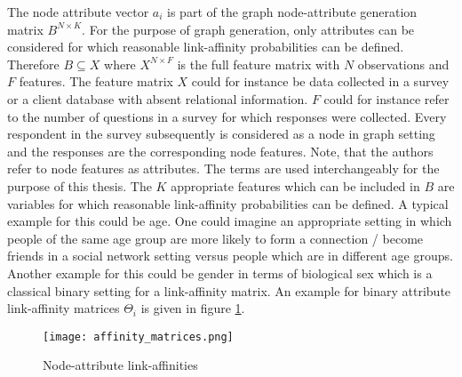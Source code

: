 	\noindent The node attribute vector $a_i$ is part of the graph node-attribute
	generation matrix $B^{N \times K}$. For the purpose of graph generation, 
	only attributes can be considered for which reasonable link-affinity 
	probabilities can be defined. Therefore $B \subseteq X$ where $X^{N \times F}$ 
	is the full feature matrix with $N$ observations and $F$ features. The 
	feature matrix $X$ could for instance be data collected in a survey or a 
	client database with absent relational information. $F$ could for instance 
	refer to the number of questions in a survey for which responses were 
	collected. Every respondent in the survey subsequently is considered as a 
	node in graph setting and the responses are the corresponding node features. 
	Note, that the authors refer to node features as attributes. The terms are 
	used interchangeably for the purpose of this thesis. The $K$ appropriate 
	features which can be included in $B$ are variables for which reasonable
	link-affinity probabilities can be defined. A typical example for this 
	could be age. One could imagine an appropriate setting in which people of 
	the same age group are more likely to form a connection / become friends in 
	a social network setting versus people which are in different age groups. 
	Another example for this could be gender in terms of biological sex which 
	is a classical binary setting for a link-affinity matrix. An example for 
	binary attribute link-affinity matrices $\Theta_i$ is given in figure 
	\ref{fig:link-affinity}.

	\begin{figure}[h]
		\centering
		\texttt{[image: affinity\_matrices.png]}
		\caption{Node-attribute link-affinities}
		\cite[p. 118]{kim2012multiplicative}
		\label{fig:link-affinity}
	\end{figure}

